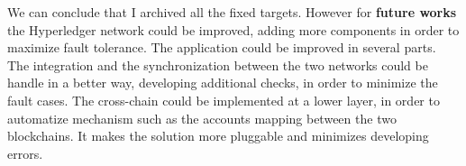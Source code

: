 We can conclude that I archived all the fixed targets. However for \textbf{future works} the Hyperledger network could be improved, adding 
more components in order to maximize fault tolerance. The application could be improved in several parts.
The integration and the synchronization between the two networks could be handle in a better way, developing additional checks, in order to 
minimize the fault cases. The cross-chain could be implemented at a lower layer, in order to automatize mechanism such as the accounts mapping 
between the two blockchains. It makes the solution more pluggable and minimizes developing errors.  


